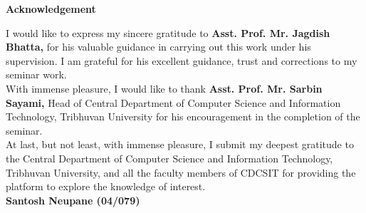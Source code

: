 \centerline{\large\textbf{Acknowledgement}}

\vspace{1cm}

I would like to express my sincere gratitude to \textbf{Asst. Prof. Mr. Jagdish Bhatta,} for his valuable guidance in carrying out this work under his supervision. I am grateful for his excellent guidance, trust and corrections to my seminar work.\\

With immense pleasure, I would like to thank \textbf{Asst. Prof. Mr. Sarbin Sayami,} Head of Central Department of Computer Science and Information Technology, Tribhuvan University for his encouragement in the completion of the seminar.\\

At last, but not least, with immense pleasure, I submit my deepest gratitude to the Central 
Department of Computer Science and Information Technology, Tribhuvan University, and all 
the faculty members of CDCSIT for providing the platform to explore the knowledge of 
interest.\\

\hspace{9.5cm}\textbf{Santosh Neupane (04/079)}

